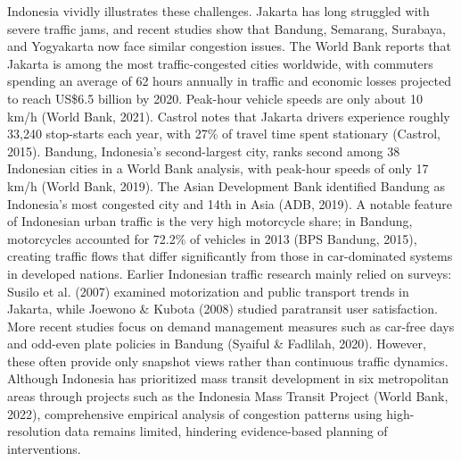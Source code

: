 \documentclass[12pt,a4paper]{article}
\begin{document}
Indonesia vividly illustrates these challenges. Jakarta has long struggled with severe traffic jams, and recent studies show that Bandung, Semarang, Surabaya, and Yogyakarta now face similar congestion issues. The World Bank reports that Jakarta is among the most traffic-congested cities worldwide, with commuters spending an average of 62 hours annually in traffic and economic losses projected to reach US\$6.5 billion by 2020. Peak-hour vehicle speeds are only about 10 km/h (World Bank, 2021). Castrol notes that Jakarta drivers experience roughly 33,240 stop-starts each year, with 27\% of travel time spent stationary (Castrol, 2015). Bandung, Indonesia’s second-largest city, ranks second among 38 Indonesian cities in a World Bank analysis, with peak-hour speeds of only 17 km/h (World Bank, 2019). The Asian Development Bank identified Bandung as Indonesia’s most congested city and 14th in Asia (ADB, 2019). A notable feature of Indonesian urban traffic is the very high motorcycle share; in Bandung, motorcycles accounted for 72.2\% of vehicles in 2013 (BPS Bandung, 2015), creating traffic flows that differ significantly from those in car-dominated systems in developed nations. Earlier Indonesian traffic research mainly relied on surveys: Susilo et al. (2007) examined motorization and public transport trends in Jakarta, while Joewono \& Kubota (2008) studied paratransit user satisfaction. More recent studies focus on demand management measures such as car-free days and odd-even plate policies in Bandung (Syaiful \& Fadlilah, 2020). However, these often provide only snapshot views rather than continuous traffic dynamics. Although Indonesia has prioritized mass transit development in six metropolitan areas through projects such as the Indonesia Mass Transit Project (World Bank, 2022), comprehensive empirical analysis of congestion patterns using high-resolution data remains limited, hindering evidence-based planning of interventions.
\end{document}

